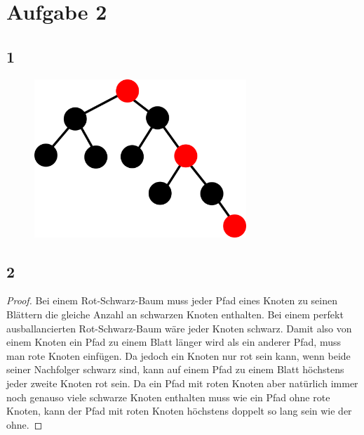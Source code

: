 \documentclass[a4paper, 11pt]{article}
\begin{document}
\section*{Aufgabe 2}

\subsection*{1}
\begin{figure}[H]
    \includegraphics[width=8cm]{minimal_tree}
    \centering
\end{figure}

\subsection*{2}
\begin{proof}
    Bei einem Rot-Schwarz-Baum muss jeder Pfad eines Knoten zu seinen Blättern die gleiche Anzahl an schwarzen Knoten enthalten.
    Bei einem perfekt ausballancierten Rot-Schwarz-Baum wäre jeder Knoten schwarz.
    Damit also von einem Knoten ein Pfad zu einem Blatt länger wird als ein anderer Pfad, muss man rote Knoten einfügen.
    Da jedoch ein Knoten nur rot sein kann, wenn beide seiner Nachfolger schwarz sind, kann auf einem Pfad zu einem Blatt höchstens jeder zweite Knoten rot sein.
    Da ein Pfad mit roten Knoten aber natürlich immer noch genauso viele schwarze Knoten enthalten muss wie ein Pfad ohne rote Knoten, kann der Pfad mit roten Knoten höchstens doppelt so lang sein wie der ohne.
\end{proof}
\end{document}
